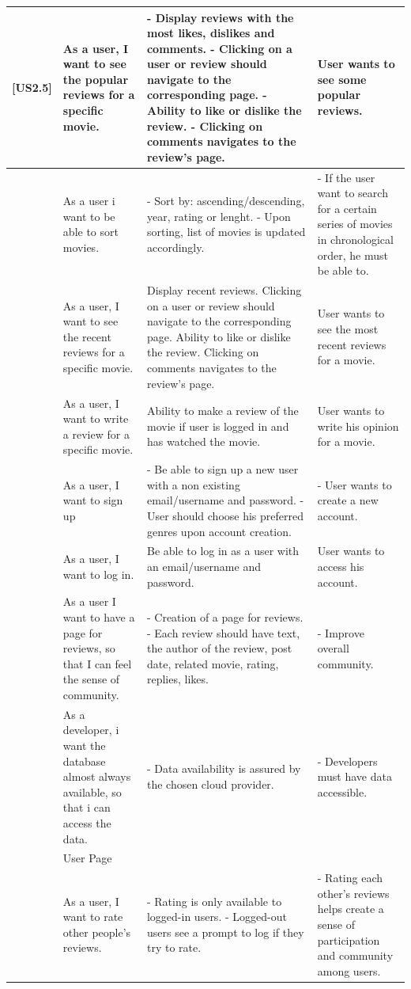 \documentclass{article}
\begin{document}
\begin{longtable}{|p{1cm}|p{3cm}|p{6cm}|p{6cm}|}
[US2.5] & As a user, I want to see the popular reviews for a specific movie. & - Display reviews with the most likes, dislikes and comments. - Clicking on a user or review should navigate to the corresponding page. - Ability to like or dislike the review. - Clicking on comments navigates to the review's page. & User wants to see some popular reviews. \\ \hline
[US3.4] & As a user i want to be able to sort movies. & - Sort by: ascending/descending, year, rating or lenght. - Upon sorting, list of movies is updated accordingly. & - If the user want to search for a certain series of movies in chronological order, he must be able to. \\ \hline
[US2.6] & As a user, I want to see the recent reviews for a specific movie. & Display recent reviews. Clicking on a user or review should navigate to the corresponding page. Ability to like or dislike the review. Clicking on comments navigates to the review's page. & User wants to see the most recent reviews for a movie. \\ \hline
[US2.7] & As a user, I want to write a review for a specific movie. & Ability to make a review of the movie if user is logged in and has watched the movie. & User wants to write his opinion for a movie. \\ \hline
[US5.1] & As a user, I want to sign up & - Be able to sign up a new user with a non existing email/username and password. - User should choose his preferred genres upon account creation. & - User wants to create a new account. \\ \hline
[US5.2] & As a user, I want to log in. & Be able to log in as a user with an email/username and password. & User wants to access his account. \\ \hline
[US4.1] & As a user I want to have a page for reviews, so that I can feel the sense of community. & - Creation of a page for reviews. - Each review should have text, the author of the review, post date, related movie, rating, replies, likes. & - Improve overall community. \\ \hline
[US7.4] & As a developer, i want the database almost always available, so that i can access the data. & - Data availability is assured by the chosen cloud provider. & - Developers must have data accessible. \\ \hline
[US9] & User Page &  &  \\ \hline
[US4.2] & As a  user, I want to rate other people's reviews. & - Rating is only available to logged-in users. - Logged-out users see a prompt to log if they try to rate. & - Rating each other's reviews helps create a sense of participation and community among users. \\ \hline

\end{longtable}
\end{document}
